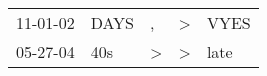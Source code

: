 \begin{supertabular}{lllll}
 11-01-02 &  DAYS &             , &  \textgreater &  VYES \\
 05-27-04 &   40s &  \textgreater &  \textgreater &  late \\
\end{supertabular}

